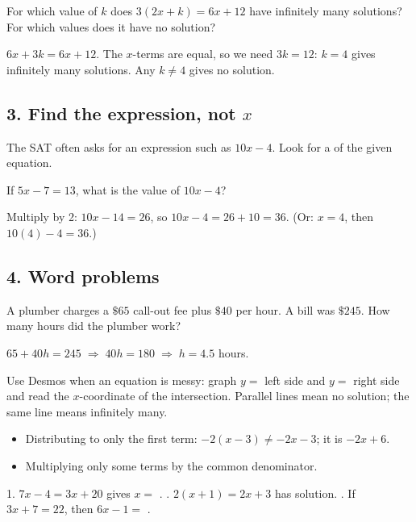For which value of $k$ does $3(2x+k)=6x+12$ have infinitely many solutions? For which values does it have no solution?
\begin{workspace}[2.4cm]
$6x+3k=6x+12$. The $x$-terms are equal, so we need $3k=12$: $k=4$ gives infinitely many solutions. Any $k\neq4$ gives no solution.
\end{workspace}

\subsection*{3. Find the expression, not $x$}
The SAT often asks for an expression such as $10x-4$. Look for a  of the given equation.

If $5x-7=13$, what is the value of $10x-4$?
\begin{workspace}[2cm]
Multiply by 2: $10x-14=26$, so $10x-4=26+10=36$. (Or: $x=4$, then $10(4)-4=36$.)
\end{workspace}

\subsection*{4. Word problems}
A plumber charges a $\$65$ call-out fee plus $\$40$ per hour. A bill was $\$245$. How many hours did the plumber work?
\begin{workspace}[2cm]
$65+40h=245 \;\Rightarrow\; 40h=180 \;\Rightarrow\; h=4.5$ hours.
\end{workspace}

\begin{aptip}
Use Desmos when an equation is messy: graph $y=$ left side and $y=$ right side and read the $x$-coordinate of the intersection. Parallel lines mean no solution; the same line means infinitely many.
\end{aptip}

\begin{mistakes}
\begin{itemize}
\item Distributing to only the first term: $-2(x-3)\neq-2x-3$; it is $-2x+6$.
\item Multiplying only some terms by the common denominator.
\end{itemize}
\end{mistakes}

\begin{quickcheck}
1. $7x-4=3x+20$ gives $x=$ . . $2(x+1)=2x+3$ has  solution. . If $3x+7=22$, then $6x-1=$ .
\end{quickcheck}

